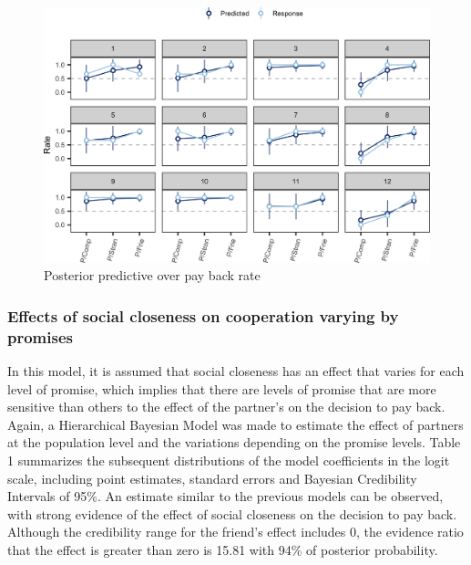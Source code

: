 \documentclass[smallextended]{svjour3}       %
\begin{document}
\begin{figure}

{\centering \includegraphics[width=1\linewidth,height=0.42\textheight]{behavioral-promises_files/figure-latex/fig5-1} 

}

\caption{Posterior predictive over pay back rate}\label{fig:fig5}
\end{figure}

\hypertarget{effects-of-social-closeness-on-cooperation-varying-by-promises}{%
\subsubsection{Effects of social closeness on cooperation varying by
promises}\label{effects-of-social-closeness-on-cooperation-varying-by-promises}}

In this model, it is assumed that social closeness has an effect that
varies for each level of promise, which implies that there are levels of
promise that are more sensitive than others to the effect of the
partner's on the decision to pay back. Again, a Hierarchical Bayesian
Model was made to estimate the effect of partners at the population
level and the variations depending on the promise levels. Table 1
summarizes the subsequent distributions of the model coefficients in the
logit scale, including point estimates, standard errors and Bayesian
Credibility Intervals of 95\%. An estimate similar to the previous
models can be observed, with strong evidence of the effect of social
closeness on the decision to pay back. Although the credibility range
for the friend's effect includes 0, the evidence ratio that the effect
is greater than zero is 15.81 with 94\% of posterior probability.
\end{document}
